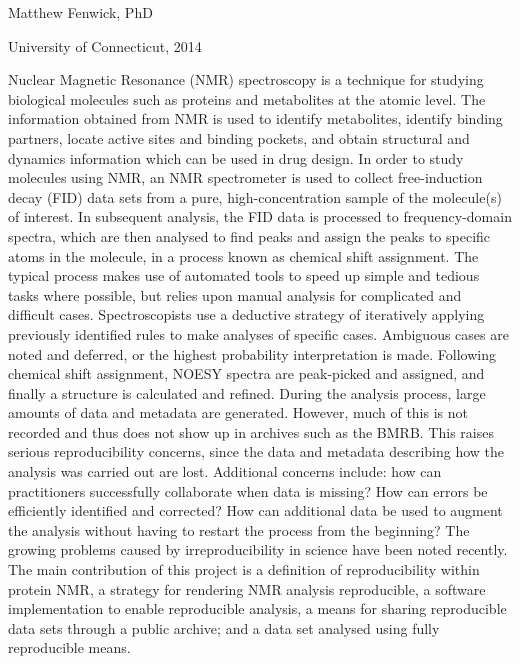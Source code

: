 \pagestyle{myabstract} %
\thispagestyle{empty} %

\begin{center}
  {\LARGE \mattftitle{}}
  
  \vspace{2cm}

  Matthew Fenwick, PhD
  
  \vspace{0.5cm}

  University of Connecticut, 2014
  
  \vspace{1in}
\end{center}

\thispagestyle{empty}
Nuclear Magnetic Resonance (NMR) spectroscopy is a technique for studying 
biological molecules such as proteins and metabolites at the atomic level.  
The information obtained from NMR is used to identify metabolites, identify 
binding partners, locate active sites and binding pockets, and obtain 
structural and dynamics information which can be used in drug design.  In 
order to study molecules using NMR, an NMR spectrometer is used to collect 
free-induction decay (FID) data sets from a pure, high-concentration sample 
of the molecule(s) of interest.  In subsequent analysis, the FID data is 
processed to frequency-domain spectra, which are then analysed to find peaks 
and assign the peaks to specific atoms in the molecule, in a process known as 
chemical shift assignment.  The typical process makes use of automated tools to 
speed up simple and tedious tasks where possible, but relies upon manual 
analysis for complicated and difficult cases.  Spectroscopists use a deductive 
strategy of iteratively applying previously identified rules to make analyses 
of specific cases.  Ambiguous cases are noted and deferred, or the highest 
probability interpretation is made.  Following chemical shift assignment, 
NOESY spectra are peak-picked and assigned, and finally a structure is 
calculated and refined.  During the analysis process, large amounts of data 
and metadata are generated.  However, much of this is not recorded and thus 
does not show up in archives such as the BMRB.  This raises serious 
reproducibility concerns, since the data and metadata describing how the 
analysis was carried out are lost.  Additional concerns include: how can 
practitioners successfully collaborate when data is missing?  How can errors 
be efficiently identified and corrected?  How can additional data be used to 
augment the analysis without having to restart the process from the beginning?  
The growing problems caused by irreproducibility in science have been noted 
recently.  The main contribution of this project is a definition of 
reproducibility within protein NMR, a strategy for rendering NMR analysis 
reproducible, a software implementation to enable reproducible analysis, a 
means for sharing reproducible data sets through a public archive; and a data 
set analysed using fully reproducible means.

\clearpage
\pagestyle{plain}

